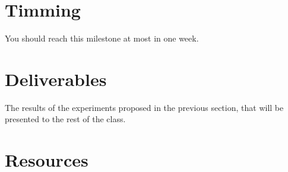 \section{Timming}

You should reach this milestone at most in one week.

\section{Deliverables}

The results of the experiments proposed in the previous section, that
will be presented to the rest of the class.


\section{Resources}


